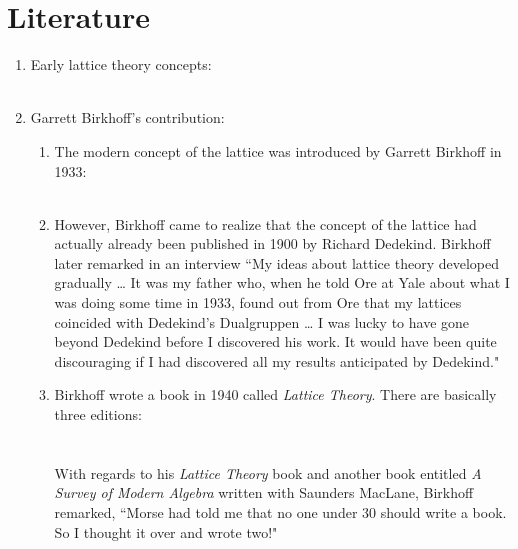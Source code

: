 \section{Literature}
\begin{survey}
\begin{enumerate}
  \item Early lattice theory concepts:
     \\
     \\

  \item Garrett Birkhoff's contribution:
    \begin{enumerate}
      \item The modern concept of the lattice was introduced by Garrett Birkhoff in 1933:
            \\ 
            \\
      
      \item However, Birkhoff came to realize that the concept of the lattice
            had actually already been published in 1900 by Richard Dedekind.
            Birkhoff later remarked in an interview
            ``My ideas about lattice theory developed gradually \ldots
            It was my father who, when he told Ore at Yale about what I was doing some time in 1933,
            found out from Ore that my lattices coincided with Dedekind's Dualgruppen \ldots
            I was lucky to have gone beyond Dedekind before I discovered his work.
            It would have been quite discouraging if I had discovered all my results
            anticipated by Dedekind."
      
      \item Birkhoff wrote a book in 1940 called \emph{Lattice Theory}. There are basically
            three editions:
            \\
            \\
            \\
            With regards to his \emph{Lattice Theory} book and another book entitled
            \emph{A Survey of Modern Algebra} written with Saunders MacLane,
            Birkhoff remarked,
            ``Morse had told me that no one under 30 should write a book.
            So I thought it over and wrote two!"
    \end{enumerate}


\end{enumerate}
\end{survey}
